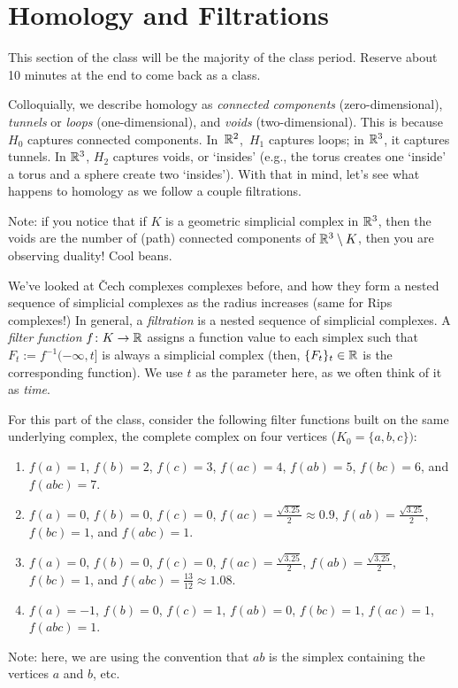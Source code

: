 \documentclass{article}
\begin{document}
\pagebreak
\section*{Homology and Filtrations}

This section of the class will be the majority of the class period. Reserve
about 10 minutes at the end to come back as a class.

Colloquially, we describe homology as \emph{connected components}
(zero-dimensional), \emph{tunnels} or \emph{loops} (one-dimensional), and
\emph{voids} (two-dimensional).  This is because $H_0$ captures connected
components.  In~${\mathbb R}^2$,~$H_1$ captures loops; in ${\mathbb R}^3$, it captures tunnels.
In ${\mathbb R}^3$, $H_2$ captures voids, or `insides' (e.g., the torus creates one
`inside' a torus and a sphere create two `insides').  With that in mind, let's
see what happens to homology as we follow a couple filtrations.

Note: if you notice that if $K$ is a geometric simplicial complex in ${\mathbb R}^3$,
then the voids are the number of (path) connected components of ${\mathbb R}^3 \setminus
K$, then you are observing duality! Cool beans.

We've looked at \v{C}ech complexes complexes before, and how they
form a nested sequence of simplicial complexes as the radius increases (same for
Rips complexes!) In general, a \emph{filtration} is a nested sequence of
simplicial complexes. A \emph{filter function} $f \colon K \to {\mathbb R}$ assigns a
function value to each simplex such that $F_t:=f^{-1}(-\infty,t]$ is always a
simplicial complex (then, $\{F_t\}_t\in {\mathbb R}$ is the corresponding function).  We
use $t$ as the parameter here, as we often think of it as \emph{time}.

For this part of the class, consider the following filter functions built on the
same underlying complex, the complete complex on four vertices
($K_0=\{a,b,c\})$:
\begin{enumerate}
    \item[Group 1:]
        $f(a)=1$,
        $f(b)=2$,
        $f(c)=3$,
        $f(ac)=4$,
        $f(ab)=5$,
        $f(bc)=6$, and
        $f(abc)=7$.
    \item[Group 2:]
        $f(a)=0$,
        $f(b)=0$,
        $f(c)=0$,
        $f(ac)=\frac{\sqrt{3.25}}{2} \approx 0.9$,
        $f(ab)=\frac{\sqrt{3.25}}{2}$,
        $f(bc)=1$, and
        $f(abc) =1$.
    \item[Group 3:]
        $f(a)=0$,
        $f(b)=0$,
        $f(c)=0$,
        $f(ac)=\frac{\sqrt{3.25}}{2}$,
        $f(ab)=\frac{\sqrt{3.25}}{2}$,
        $f(bc)=1$, and
        $f(abc)=\frac{13}{12}\approx 1.08 $.
    \item[Bonus:]
        $f(a)=-1$,
        $f(b)=0$,
        $f(c)=1$,
        $f(ab)=0$,
        $f(bc)=1$,
        $f(ac)=1$,
        $f(abc)=1$.
\end{enumerate}
Note: here, we are using the convention that $ab$ is the simplex containing the
vertices $a$ and $b$, etc.
\end{document}
